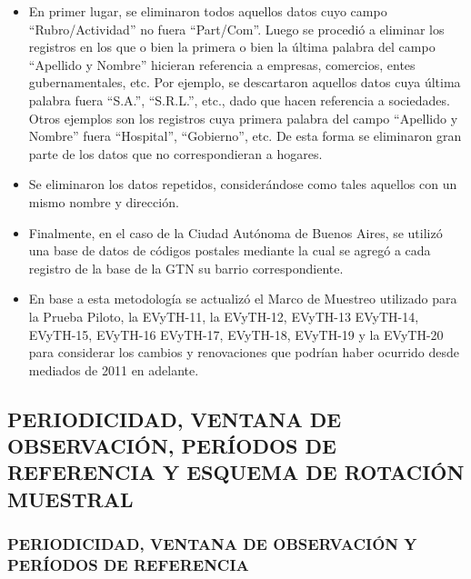\documentclass[
  openany]{book}
\begin{document}
\begin{itemize}
\item
  En primer lugar, se eliminaron todos aquellos datos cuyo campo ``Rubro/Actividad'' no fuera ``Part/Com''.
  Luego se procedió a eliminar los registros en los que o bien la primera o bien la última palabra del campo ``Apellido y Nombre'' hicieran referencia a empresas, comercios, entes gubernamentales, etc.
  Por ejemplo, se descartaron aquellos datos cuya última palabra fuera ``S.A.'', ``S.R.L.'', etc., dado que hacen referencia a sociedades.
  Otros ejemplos son los registros cuya primera palabra del campo ``Apellido y Nombre'' fuera ``Hospital'', ``Gobierno'', etc.
  De esta forma se eliminaron gran parte de los datos que no correspondieran a hogares.
\item
  Se eliminaron los datos repetidos, considerándose como tales aquellos con un mismo nombre y dirección.
\item
  Finalmente, en el caso de la Ciudad Autónoma de Buenos Aires, se utilizó una base de datos de códigos postales mediante la cual se agregó a cada registro de la base de la GTN su barrio correspondiente.
\item
  En base a esta metodología se actualizó el Marco de Muestreo utilizado para la Prueba Piloto, la EVyTH-11, la EVyTH-12, EVyTH-13 EVyTH-14, EVyTH-15, EVyTH-16 EVyTH-17, EVyTH-18, EVyTH-19 y la EVyTH-20 para considerar los cambios y renovaciones que podrían haber ocurrido desde mediados de 2011 en adelante.
\end{itemize}

\hypertarget{periodicidad-ventana-de-observaciuxf3n-peruxedodos-de-referencia-y-esquema-de-rotaciuxf3n-muestral}{%
\subsection{\texorpdfstring{\textbf{PERIODICIDAD, VENTANA DE OBSERVACIÓN, PERÍODOS DE REFERENCIA Y ESQUEMA DE ROTACIÓN MUESTRAL}}{PERIODICIDAD, VENTANA DE OBSERVACIÓN, PERÍODOS DE REFERENCIA Y ESQUEMA DE ROTACIÓN MUESTRAL}}\label{periodicidad-ventana-de-observaciuxf3n-peruxedodos-de-referencia-y-esquema-de-rotaciuxf3n-muestral}}

\hypertarget{periodicidad-ventana-de-observaciuxf3n-y-peruxedodos-de-referencia}{%
\subsubsection{\texorpdfstring{\textbf{PERIODICIDAD, VENTANA DE OBSERVACIÓN Y PERÍODOS DE REFERENCIA}}{PERIODICIDAD, VENTANA DE OBSERVACIÓN Y PERÍODOS DE REFERENCIA}}\label{periodicidad-ventana-de-observaciuxf3n-y-peruxedodos-de-referencia}}
\end{document}
